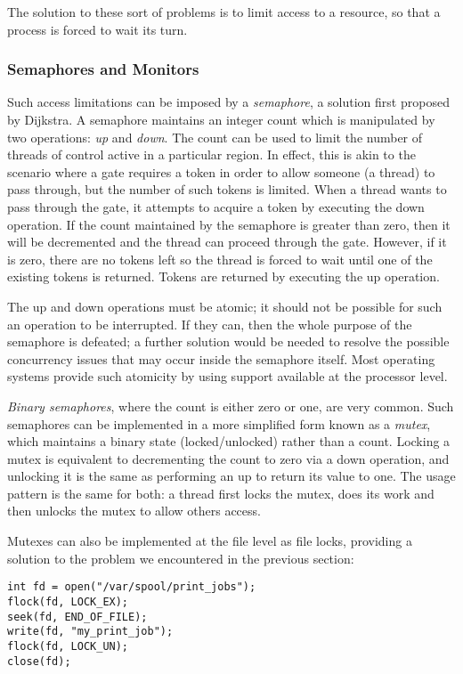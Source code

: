 The solution to these sort of problems is to limit access to a
resource, so that a process is forced to wait its turn.

\subsubsection{Semaphores and Monitors}

Such access limitations can be imposed by a \emph{semaphore}, a
solution first proposed by Dijkstra\cite{semaphore}.  A semaphore
maintains an integer count which is manipulated by two operations:
\emph{up} and \emph{down}.  The count can be used to limit the number
of threads of control active in a particular region.  In effect, this
is akin to the scenario where a gate requires a token in order to
allow someone (a thread) to pass through, but the number of such
tokens is limited.  When a thread wants to pass through the gate, it
attempts to acquire a token by executing the down operation.  If the
count maintained by the semaphore is greater than zero, then it will
be decremented and the thread can proceed through the gate.  However,
if it is zero, there are no tokens left so the thread is forced to
wait until one of the existing tokens is returned.  Tokens are
returned by executing the up operation.

The up and down operations must be atomic; it should not be possible
for such an operation to be interrupted.  If they can, then the whole
purpose of the semaphore is defeated; a further solution would be
needed to resolve the possible concurrency issues that may occur
inside the semaphore itself.  Most operating systems provide such
atomicity by using support available at the processor level.

\emph{Binary semaphores}, where the count is either zero or one, are
very common.  Such semaphores can be implemented in a more simplified
form known as a \emph{mutex}, which maintains a binary state
(locked/unlocked) rather than a count.  Locking a mutex is equivalent
to decrementing the count to zero via a down operation, and unlocking
it is the same as performing an up to return its value to one.  The
usage pattern is the same for both: a thread first locks the mutex,
does its work and then unlocks the mutex to allow others access.

Mutexes can also be implemented at the file level as file locks,
providing a solution to the problem we encountered in the previous
section:

\begin{verbatim}
int fd = open("/var/spool/print_jobs");
flock(fd, LOCK_EX);
seek(fd, END_OF_FILE);
write(fd, "my_print_job");
flock(fd, LOCK_UN);
close(fd);
\end{verbatim}

